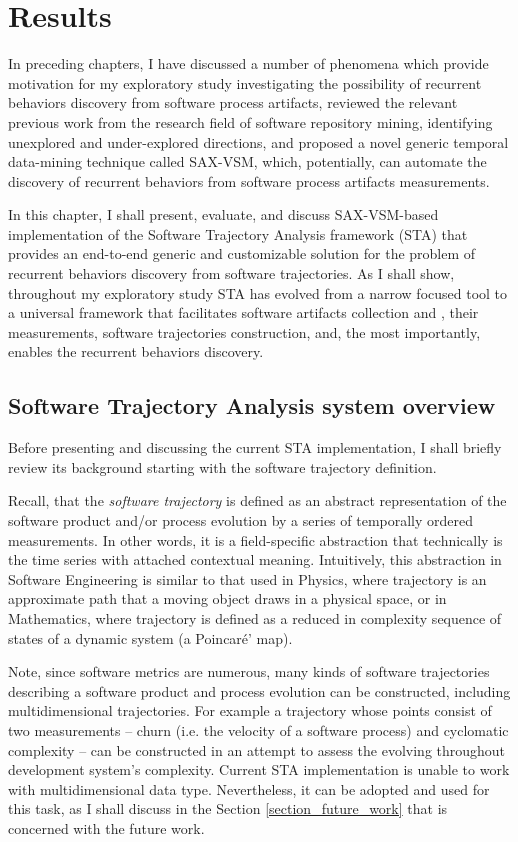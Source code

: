 \chapter{Results}\label{chapter_sta}
In preceding chapters, I have discussed a number of phenomena which provide motivation for my exploratory study investigating the possibility of recurrent behaviors discovery from software process artifacts, reviewed the relevant previous work from the research field of software repository mining, identifying unexplored and under-explored directions, and proposed a novel generic temporal data-mining technique called \mbox{SAX-VSM}, which, potentially, can automate the discovery of recurrent behaviors from software process artifacts measurements.

In this chapter, I shall present, evaluate, and discuss \mbox{SAX-VSM}-based implementation of the Software Trajectory Analysis framework (STA) that provides an end-to-end generic and customizable solution for the problem of recurrent behaviors discovery from software trajectories.  As I shall show, throughout my exploratory study STA has evolved from a narrow focused tool to a universal framework that facilitates software artifacts collection and , their measurements, software trajectories construction, and, the most importantly, enables the recurrent behaviors discovery.

\section{Software Trajectory Analysis system overview}\label{section_sta_overview}
Before presenting and discussing the current STA implementation, I shall briefly review its background starting with the software trajectory definition. 

Recall, that the \textit{software trajectory} is defined as an abstract representation of the software product and/or process evolution by a series of temporally ordered measurements. In other words, it is a field-specific abstraction that technically is the time series with attached contextual meaning. Intuitively, this abstraction in Software Engineering is similar to that used in Physics, where trajectory is an approximate path that a moving object draws in a physical space, or in Mathematics, where trajectory is defined as a reduced in complexity sequence of states of a dynamic system (a Poincar\'{e}' map).

Note, since software metrics are numerous, many kinds of software trajectories describing a software product and process evolution can be constructed, including multidimensional trajectories. For example a trajectory whose points consist of two measurements -- churn (i.e. the velocity of a software process) and cyclomatic complexity -- can be constructed in an attempt to assess the evolving throughout development system's complexity. Current STA implementation is unable to work with multidimensional data type. Nevertheless, it can be adopted and used for this task, as I shall discuss in the Section \ref{section_future_work} that is concerned with the future work.

